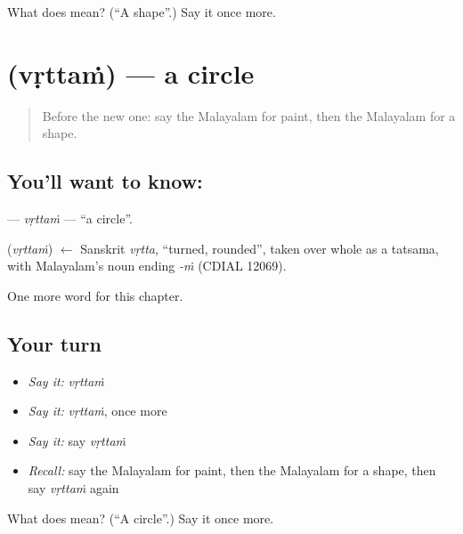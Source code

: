\begin{tcolorbox}[breakable,colback=teal!4,colframe=teal!35!black,title={Before you move on}]
What does  mean? (\textquotedblleft{}A shape\textquotedblright{}.) Say it once more.
\end{tcolorbox}
\section[\texorpdfstring{\ml{വൃത്തം} (vṛttaṁ)}{വൃത്തം (vṛttaṁ)}]{ (vṛttaṁ) — a circle}

\label{lesson:ML-C258-vrttam}



\begin{quote}
Before the new one: say the Malayalam for paint, then the Malayalam for a shape.
\end{quote}

\subsection*{You'll want to know: }
\textbf{} — \emph{vṛttaṁ} — \textquotedblleft{}a circle\textquotedblright{}.

\begin{cousinweb}
\textbf{} (\emph{vṛttaṁ}) $\leftarrow$ Sanskrit \emph{vṛtta}, \textquotedblleft{}turned, rounded\textquotedblright{}, taken over whole as a tatsama, with Malayalam's noun ending \emph{-ṁ} (CDIAL 12069).
\end{cousinweb}

\begin{grammarlens}[title={What you've built}]
One more word for this chapter.
\end{grammarlens}

\subsection*{Your turn}
\begin{itemize}
\raggedright
  \item \emph{Say it:} \emph{vṛttaṁ}
  \item \emph{Say it:} \emph{vṛttaṁ}, once more
  \item \emph{Say it:} say \emph{vṛttaṁ}
  \item \emph{Recall:} say the Malayalam for paint, then the Malayalam for a shape, then say \emph{vṛttaṁ} again
\end{itemize}

\begin{tcolorbox}[breakable,colback=teal!4,colframe=teal!35!black,title={Before you move on}]
What does  mean? (\textquotedblleft{}A circle\textquotedblright{}.) Say it once more.
\end{tcolorbox}
